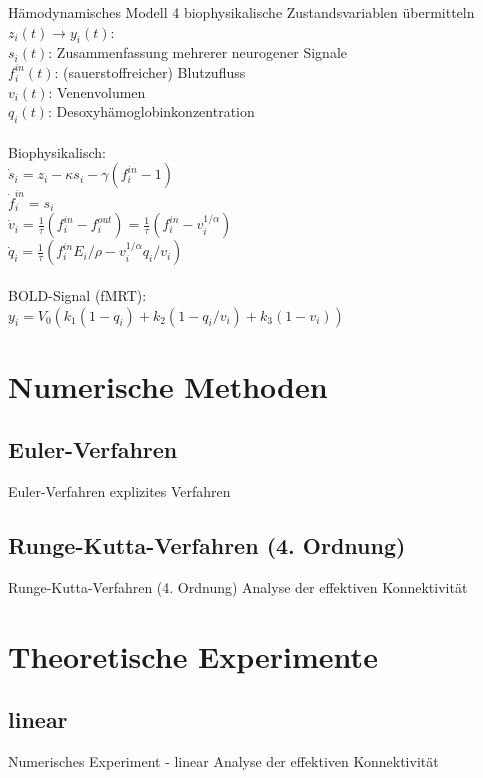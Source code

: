 \documentclass{beamer}
\begin{document}
\begin{frame}{Hämodynamisches Modell}
4 biophysikalische Zustandsvariablen übermitteln $z_i(t)\rightarrow y_i(t)$:\\
$s_i(t)$: Zusammenfassung mehrerer neurogener Signale\\$ f^{in}_i(t)$: (sauerstoffreicher) Blutzufluss \\$ v_i(t)$: Venenvolumen \\$ q_i(t)$: Desoxyhämoglobinkonzentration~\\~\\
Biophysikalisch:~\\
$\dot{s}_i=z_i-\kappa s_i -\gamma (f^{in}_i-1)$\\
$\dot{f}^{in}_i=s_i$\\
$\dot{v}_i=\frac{1}{\tau}(f^{in}_i-f^{out}_i)=\frac{1}{\tau}(f^{in}_i-v_i^{1/\alpha})$\\
$\dot{q}_i=\frac{1}{\tau}(f^{in}_iE_i/\rho-v_i^{1/\alpha}q_i/v_i)$\\~\\
BOLD-Signal (fMRT):\\ $y_i=V_0(k_1(1-q_i)+k_2(1-q_i/v_i)+k_3(1-v_i))$
\end{frame}

\section{Numerische Methoden}
\subsection{Euler-Verfahren}
	\begin{frame}{Euler-Verfahren}
		explizites Verfahren
	\end{frame}
	
\subsection{Runge-Kutta-Verfahren (4. Ordnung)}
	\begin{frame}{Runge-Kutta-Verfahren (4. Ordnung)}
		Analyse der effektiven Konnektivität
	\end{frame}

\section{Theoretische Experimente}
\subsection{linear}
	\begin{frame}{Numerisches Experiment - linear}
		Analyse der effektiven Konnektivität
	\end{frame}
\end{document}
